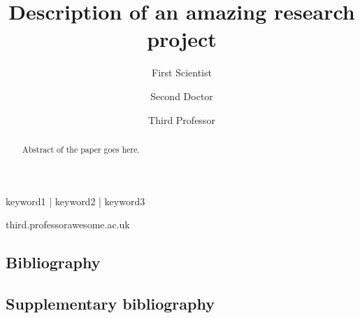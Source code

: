 \documentclass[9pt]{RoyleLab-StyleBioRxiv}
\begin{document}

\title{Description of an amazing research project}

\author[1]{First Scientist }
\author[2]{Second Doctor }
\author[1,\Letter]{Third Professor }
\date{}

\maketitle

\begin{abstract}
	Abstract of the paper goes here.
	\lipsum[1]
\end{abstract}

\begin{keywords}
	keyword1 | keyword2 | keyword3
\end{keywords}

\begin{corrauthor}
	third.professor\at awesome.ac.uk
\end{corrauthor}

\begin{refsection}
	
	
\section*{Bibliography}
\printbibliography[heading=none]
\end{refsection}

\begin{refsection}


\section*{Supplementary bibliography}
\printbibliography[heading=none]
\end{refsection}
\end{document}
